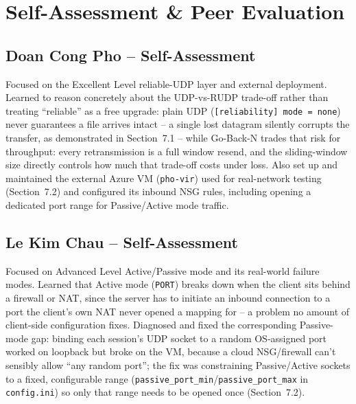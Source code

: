 \documentclass[11pt]{article}
\begin{document}
\clearpage
\section{Self-Assessment \& Peer Evaluation}

\subsection*{Doan Cong Pho -- Self-Assessment}
Focused on the Excellent Level reliable-UDP layer and external deployment.
Learned to reason concretely about the UDP-vs-RUDP trade-off rather than treating
``reliable'' as a free upgrade: plain UDP (\texttt{[reliability] mode = none}) never
guarantees a file arrives intact -- a single lost datagram silently corrupts the
transfer, as demonstrated in Section~7.1 -- while Go-Back-N trades that risk for
throughput: every retransmission is a full window resend, and the sliding-window
size directly controls how much that trade-off costs under loss. Also set up and
maintained the external Azure VM (\texttt{pho-vir}) used for real-network testing
(Section~7.2) and configured its inbound NSG rules, including opening a dedicated
port range for Passive/Active mode traffic.


\subsection*{Le Kim Chau -- Self-Assessment}
Focused on Advanced Level Active/Passive mode and its real-world failure modes.
Learned that Active mode (\texttt{PORT}) breaks down when the client sits behind a
firewall or NAT, since the server has to initiate an inbound connection to a port
the client's own NAT never opened a mapping for -- a problem no amount of
client-side configuration fixes. Diagnosed and fixed the corresponding Passive-mode
gap: binding each session's UDP socket to a random OS-assigned port worked on
loopback but broke on the VM, because a cloud NSG/firewall can't sensibly allow
``any random port''; the fix was constraining Passive/Active sockets to a fixed,
configurable range (\texttt{passive\_port\_min}/\texttt{passive\_port\_max} in
\texttt{config.ini}) so only that range needs to be opened once (Section~7.2).
\end{document}

